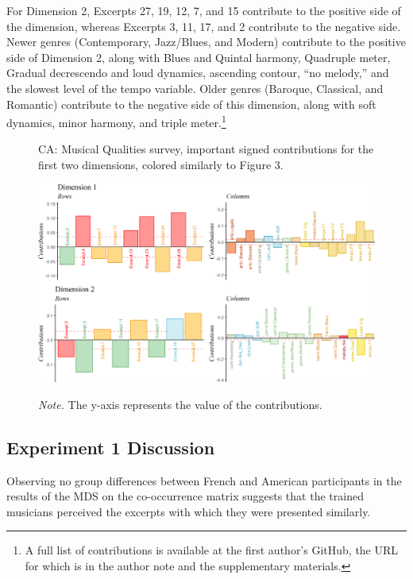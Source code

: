 \documentclass[
  english,
  man,floatsintext]{apa6}
\begin{document}
For Dimension 2, Excerpts 27, 19, 12, 7, and 15 contribute to the positive side of the dimension, whereas Excerpts 3, 11, 17, and 2 contribute to the negative side. Newer genres (Contemporary, Jazz/Blues, and Modern) contribute to the positive side of Dimension 2, along with Blues and Quintal harmony, Quadruple meter, Gradual decrescendo and loud dynamics, ascending contour, ``no melody,'' and the slowest level of the tempo variable. Older genres (Baroque, Classical, and Romantic) contribute to the negative side of this dimension, along with soft dynamics, minor harmony, and triple meter.\footnote{A full list of contributions is available at the first author's GitHub, the URL for which is in the author note and the supplementary materials.}

\begin{figure}   
  \centering  
  \caption{CA: Musical Qualities survey, important signed contributions for the first two dimensions, colored similarly to Figure 3.}
    \includegraphics{./Music-Descriptor-Space_files/figure-latex/contributionsQcode-1.png}
  \label{fig:contributionsQ}
  \caption*{\footnotesize \textit{Note.} The y-axis represents the value of the contributions.}
\end{figure}

\hypertarget{experiment-1-discussion}{%
\subsection{Experiment 1 Discussion}\label{experiment-1-discussion}}

Observing no group differences between French and American participants in the results of the MDS on the co-occurrence matrix suggests that the trained musicians perceived the excerpts with which they were presented similarly.
\end{document}
